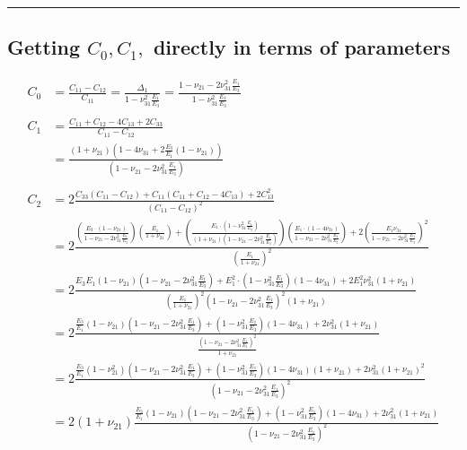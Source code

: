 \documentclass{article}
\begin{document}
\noindent\rule{8cm}{0.4pt}

\subsection{Getting $C_0, C_1,$ directly in terms of parameters}

\begin{align}
C_0 
&= \frac{C_{11} - C_{12}}{C_{11}} = \frac{\Delta_1}{1-\nu_{31}^2 \frac{E_1}{E_3}} = \frac{1-\nu_{21}-2\nu_{31}^2\frac{E_1}{E_3}}{1-\nu_{31}^2 \frac{E_1}{E_3}} \\
\\
C_1 
&= \frac{C_{11} +C_{12} -4C_{13} +2C_{33}}{C_{11}-C_{12}}   \\
&= \frac{\left( 1+\nu_{21} \right) \left( 1-4\nu_{31} + 2 \frac{E_3}{E_1} \left( 1-\nu_{21} \right) \right) }{ \left( 1-\nu_{21}-2\nu_{31}^2\frac{E_1}{E_3} \right) }  \\
\\
C_2 
&= 2 \frac{C_{33} \left( C_{11} - C_{12} \right) + C_{11} \left( C_{11}+C_{12}-4C_{13} \right) + 2C_{13}^2 }{\left( C_{11}-C_{12} \right)^2}   \\
&= 2 \frac{ \left( \frac{ E_3 \cdot \left( 1-\nu_{21} \right) }{ 1-\nu_{21}-2\nu_{31}^2\frac{E_1}{E_3} } \right) \left( \frac{E_1}{1+\nu_{21}} \right) + \left( \frac{E_1 \cdot \left( 1-\nu_{31}^2 \frac{E_1}{E_3} \right)}{ \left(1+\nu_{21}\right) \left( 1-\nu_{21}-2\nu_{31}^2\frac{E_1}{E_3} \right) } \right)  \left( \frac{E_1 \cdot \left(1-4\nu_{31} \right)}{ 1-\nu_{21}-2\nu_{31}^2\frac{E_1}{E_3} } \right) + 2 \left( \frac{E_1 \nu_{31}}{ 1-\nu_{21}-2\nu_{31}^2\frac{E_1}{E_3} } \right)^2 }{\left( \frac{E_1}{1+\nu_{21}} \right)^2}   \\
&= 2 \frac{ E_3 E_1 \left( 1-\nu_{21} \right) \left( 1-\nu_{21}-2\nu_{31}^2\frac{E_1}{E_3}  \right) + E_1^2 \cdot \left( 1-\nu_{31}^2 \frac{E_1}{E_3} \right) \left(1-4\nu_{31} \right)+ 2 E_1^2 \nu_{31}^2 \left( 1+\nu_{21} \right) }{\left( \frac{E_1}{1+\nu_{21}} \right)^2 \left( 1-\nu_{21}-2\nu_{31}^2\frac{E_1}{E_3} \right)^2 \left( 1+\nu_{21} \right) }   \\
&= 2 \frac{ \frac{E_3}{E_1} \left( 1-\nu_{21} \right) \left( 1-\nu_{21}-2\nu_{31}^2\frac{E_1}{E_3}  \right) + \left( 1-\nu_{31}^2 \frac{E_1}{E_3} \right) \left(1-4\nu_{31} \right)+ 2\nu_{31}^2 \left( 1+\nu_{21} \right) }{ \frac{ \left( 1-\nu_{21}-2\nu_{31}^2\frac{E_1}{E_3} \right)^2 }{1+\nu_{21}} }   \\
&= 2 \frac{ \frac{E_3}{E_1} \left( 1-\nu_{21}^2 \right) \left( 1-\nu_{21}-2\nu_{31}^2\frac{E_1}{E_3}  \right) + \left( 1-\nu_{31}^2 \frac{E_1}{E_3} \right) \left(1-4\nu_{31} \right) \left(1+\nu_{21}\right) + 2\nu_{31}^2 \left( 1+\nu_{21} \right)^2 }{ \left( 1-\nu_{21}-2\nu_{31}^2\frac{E_1}{E_3} \right)^2 }   \\
&= 2 \left( 1+\nu_{21} \right) \frac{ \frac{E_3}{E_1} \left( 1-\nu_{21} \right) \left( 1-\nu_{21}-2\nu_{31}^2\frac{E_1}{E_3}  \right) + \left( 1-\nu_{31}^2 \frac{E_1}{E_3} \right) \left(1-4\nu_{31} \right)+ 2\nu_{31}^2 \left( 1+\nu_{21} \right) }{ \left( 1-\nu_{21}-2\nu_{31}^2\frac{E_1}{E_3} \right)^2 }   \\
\end{align}
\end{document}
